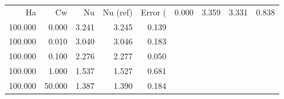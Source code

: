 \begin{tabular}{rrrrr}
\toprule
Ha & Cw & Nu & Nu (ref) & Error (%
 & 0.000 & 3.359 & 3.331 & 0.838 \\
100.000 & 0.000 & 3.241 & 3.245 & 0.139 \\
100.000 & 0.010 & 3.040 & 3.046 & 0.183 \\
100.000 & 0.100 & 2.276 & 2.277 & 0.050 \\
100.000 & 1.000 & 1.537 & 1.527 & 0.681 \\
100.000 & 50.000 & 1.387 & 1.390 & 0.184 \\
\bottomrule
\end{tabular}
